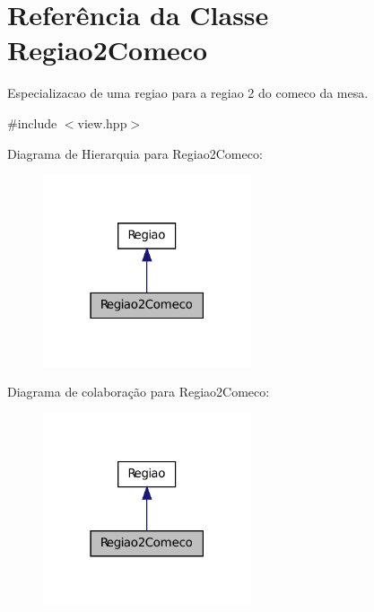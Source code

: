 \hypertarget{classRegiao2Comeco}{
\section{Referência da Classe Regiao2Comeco}
\label{classRegiao2Comeco}
}


Especializacao de uma regiao para a regiao 2 do comeco da mesa.  




{\ttfamily \#include $<$view.hpp$>$}



Diagrama de Hierarquia para Regiao2Comeco:\nopagebreak
\begin{figure}[H]
\begin{center}
\leavevmode
\includegraphics[width=174pt]{classRegiao2Comeco__inherit__graph}
\end{center}
\end{figure}


Diagrama de colaboração para Regiao2Comeco:\nopagebreak
\begin{figure}[H]
\begin{center}
\leavevmode
\includegraphics[width=174pt]{classRegiao2Comeco__coll__graph}
\end{center}
\end{figure}
